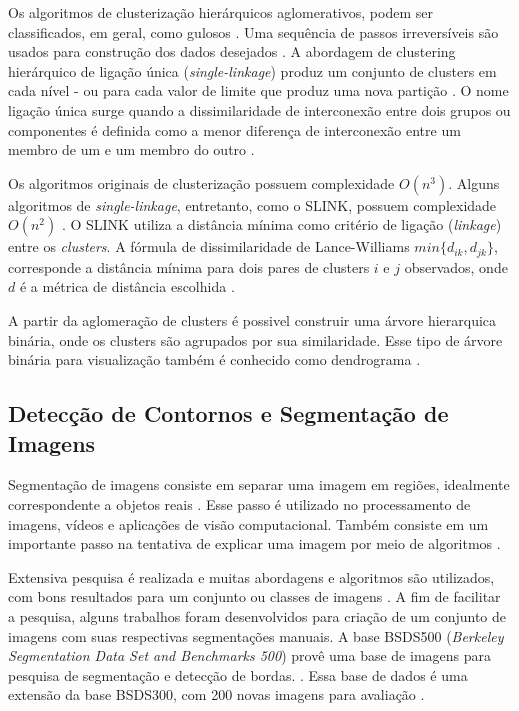 \begin{document}
Os algoritmos de clusterização hierárquicos aglomerativos, podem ser classificados, em geral, como gulosos \cite{SINGLE_LINKAGE}. Uma sequência de passos irreversíveis são usados para construção dos dados desejados \cite{SINGLE_LINKAGE}. A abordagem de clustering hierárquico de ligação única (\textit{single-linkage}) produz um conjunto de clusters em cada nível - ou para cada valor de limite que produz uma nova partição \cite{SINGLE_LINKAGE}. O nome ligação única surge quando a dissimilaridade de interconexão entre dois grupos ou componentes é definida como a menor diferença de interconexão entre um membro de um e um membro do outro \cite{SINGLE_LINKAGE}.

Os algoritmos originais de clusterização possuem complexidade $O(n^3)$. Alguns algoritmos de \textit{single-linkage}, entretanto, como o SLINK, possuem complexidade $O(n^2)$ \cite{SLINK} \cite{SINGLE_LINKAGE}. O SLINK utiliza a distância mínima como critério de ligação (\textit{linkage}) entre os \textit{clusters}. A fórmula de dissimilaridade de Lance-Williams $min\{d_{ik}, d_{jk}\}$, corresponde a distância mínima para dois pares de clusters $i$ e $j$ observados, onde $d$ é a métrica de distância escolhida \cite{SINGLE_LINKAGE}.

A partir da aglomeração de clusters é possivel construir uma árvore hierarquica binária, onde os clusters são agrupados por sua similaridade. Esse tipo de árvore binária para visualização também é conhecido como dendrograma \cite{SINGLE_LINKAGE}.


\subsection{Detecção de Contornos e Segmentação de Imagens} \label{ssec:segmentacao}

Segmentação de imagens consiste em separar uma imagem em regiões, idealmente correspondente a objetos reais \cite{ZHANG2008}. Esse passo é utilizado no processamento de imagens, vídeos e aplicações de visão computacional. Também consiste em um importante passo na tentativa de explicar uma imagem por meio de algoritmos \cite{ZHANG2008}.

Extensiva pesquisa é realizada e muitas abordagens e algoritmos são utilizados, com bons resultados para um conjunto ou classes de imagens \cite{ZHANG2008}. A fim de facilitar a pesquisa, alguns trabalhos foram desenvolvidos para criação de um conjunto de imagens com suas respectivas segmentações manuais. A base BSDS500 (\textit{Berkeley Segmentation Data Set and Benchmarks 500}) provê uma base de imagens para pesquisa de segmentação e detecção de bordas. \cite{BSDS500}. Essa base de dados é uma extensão da base BSDS300, com 200 novas imagens para avaliação \cite{BSDS500}.
\end{document}
